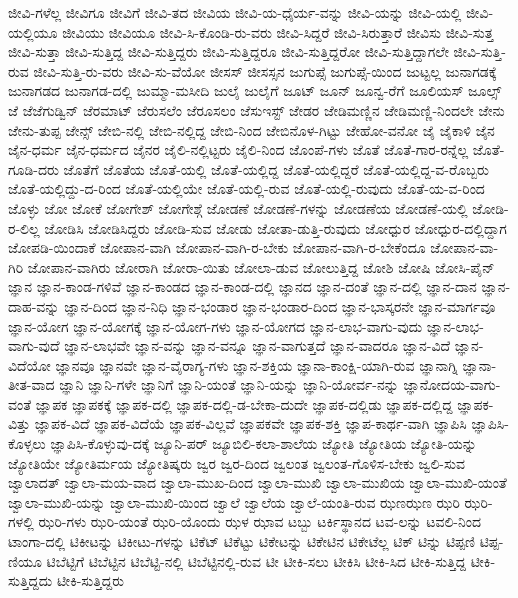 {ಜೀವಿ-ಗಳೆಲ್ಲ
ಜೀವಿಗೂ
ಜೀವಿಗೆ
ಜೀವಿ-ತದ
ಜೀವಿಯ
ಜೀವಿ-ಯ-ಧೈರ್ಯ-ವನ್ನು
ಜೀವಿ-ಯನ್ನು
ಜೀವಿ-ಯಲ್ಲಿ
ಜೀವಿ-ಯಲ್ಲಿಯೂ
ಜೀವಿಯು
ಜೀವಿಯೂ
ಜೀವಿ-ಸಿ-ಕೊಂಡಿ-ರು-ವರು
ಜೀವಿ-ಸಿದ್ದರೆ
ಜೀವಿ-ಸಿರುತ್ತಾರೆ
ಜೀವಿಸು
ಜೀವಿ-ಸುತ್ತ
ಜೀವಿ-ಸುತ್ತಾ
ಜೀವಿ-ಸುತ್ತಿದ್ದ
ಜೀವಿ-ಸುತ್ತಿದ್ದರು
ಜೀವಿ-ಸುತ್ತಿದ್ದರೂ
ಜೀವಿ-ಸುತ್ತಿದ್ದರೋ
ಜೀವಿ-ಸುತ್ತಿದ್ದಾಗಲೇ
ಜೀವಿ-ಸುತ್ತಿ-ರುವ
ಜೀವಿ-ಸುತ್ತಿ-ರು-ವರು
ಜೀವಿ-ಸು-ವೆಯೋ
ಜೀಸಸ್
ಜೀಸಸ್ಸನ
ಜುಗುಪ್ಸೆ
ಜುಗುಪ್ಸೆ-ಯಿಂದ
ಜುಟ್ಟಲ್ಲ
ಜುನಾಗಡಕ್ಕೆ
ಜುನಾಗಡದ
ಜುನಾಗಡ-ದಲ್ಲಿ
ಜುಮ್ಮಾ-ಮಸೀದಿ
ಜುಲೈ
ಜುಲೈಗೆ
ಜೂಟ್
ಜೂನ್
ಜೂನ್ವ-ರೆಗೆ
ಜೂಲಿಯಸ್
ಜೂಲ್ಸ್
ಜೆ
ಜೆಜೆಗುಡ್ವಿನ್
ಜೆರಮಾಟ್
ಜೆರುಸಲೆಂ
ಜೆರೂಸಲಂ
ಜೆಸುಇಸ್ಟ್
ಜೇಡರ
ಜೇಡಿಮಣ್ಣಿನ
ಜೇಡಿಮಣ್ಣಿ-ನಿಂದಲೇ
ಜೇನು
ಜೇನು-ತುಪ್ಪ
ಜೇನ್ಸ್
ಜೇಬಿ-ನಲ್ಲಿ
ಜೇಬಿ-ನಲ್ಲಿದ್ದ
ಜೇಬಿ-ನಿಂದ
ಜೇಬಿನೊಳ-ಗಿಟ್ಟು
ಜೇಹೋ-ವನೋ
ಜೈ
ಜೈಕಾಳಿ
ಜೈನ
ಜೈನ-ಧರ್ಮ
ಜೈನ-ಧರ್ಮದ
ಜೈನರ
ಜೈಲಿ-ನಲ್ಲಿಟ್ಟರು
ಜೈಲಿ-ನಿಂದ
ಜೊಂಪೆ-ಗಳು
ಜೊತೆ
ಜೊತೆ-ಗಾರ-ರನ್ನೆಲ್ಲ
ಜೊತೆ-ಗೂಡಿ-ದರು
ಜೊತೆಗೆ
ಜೊತೆಯ
ಜೊತೆ-ಯಲ್ಲಿ
ಜೊತೆ-ಯಲ್ಲಿದ್ದ
ಜೊತೆ-ಯಲ್ಲಿದ್ದರೆ
ಜೊತೆ-ಯಲ್ಲಿದ್ದ-ವ-ರೊಬ್ಬರು
ಜೊತೆ-ಯಲ್ಲಿದ್ದು-ದ-ರಿಂದ
ಜೊತೆ-ಯಲ್ಲಿಯೇ
ಜೊತೆ-ಯಲ್ಲಿ-ರುವ
ಜೊತೆ-ಯಲ್ಲಿ-ರುವುದು
ಜೊತೆ-ಯ-ವ-ರಿಂದ
ಜೊಳ್ಳು
ಜೋ
ಜೋಕೆ
ಜೋಗೇಶ್
ಜೋಗೇಶ್ಗೆ
ಜೋಡಣೆ
ಜೋಡಣೆ-ಗಳನ್ನು
ಜೋಡಣೆಯ
ಜೋಡಣೆ-ಯಲ್ಲಿ
ಜೋಡಿ-ರ-ಲಿಲ್ಲ
ಜೋಡಿಸಿ
ಜೋಡಿಸಿದ್ದರು
ಜೋಡಿ-ಸುವ
ಜೋಡು
ಜೋತಾ-ಡುತ್ತಿ-ರುವುದು
ಜೋಧ್ಪುರ
ಜೋಧ್ಪುರ-ದಲ್ಲಿದ್ದಾಗ
ಜೋಪಡಿ-ಯಿಂದಾಕೆ
ಜೋಪಾನ-ವಾಗಿ
ಜೋಪಾನ-ವಾಗಿ-ರ-ಬೇಕು
ಜೋಪಾನ-ವಾಗಿ-ರ-ಬೇಕೆಂದೂ
ಜೋಪಾನ-ವಾ-ಗಿರಿ
ಜೋಪಾನ-ವಾಗಿರು
ಜೋರಾಗಿ
ಜೋರಾ-ಯಿತು
ಜೋಲಾ-ಡುವ
ಜೋಲುತ್ತಿದ್ದ
ಜೋಶಿ
ಜೋಷಿ
ಜೋಸಿ-ಪೈನ್
ಜ್ಞಾನ
ಜ್ಞಾನ-ಕಾಂಡ-ಗಳಿವೆ
ಜ್ಞಾನ-ಕಾಂಡದ
ಜ್ಞಾನ-ಕಾಂಡ-ದಲ್ಲಿ
ಜ್ಞಾನದ
ಜ್ಞಾನ-ದಂತೆ
ಜ್ಞಾನ-ದಲ್ಲಿ
ಜ್ಞಾನ-ದಾನ
ಜ್ಞಾನ-ದಾಹ-ವನ್ನು
ಜ್ಞಾನ-ದಿಂದ
ಜ್ಞಾನ-ನಿಧಿ
ಜ್ಞಾನ-ಭಂಡಾರ
ಜ್ಞಾನ-ಭಂಡಾರ-ದಿಂದ
ಜ್ಞಾನ-ಭಾಸ್ಕರನೇ
ಜ್ಞಾನ-ಮಾರ್ಗವೂ
ಜ್ಞಾನ-ಯೋಗ
ಜ್ಞಾನ-ಯೋಗಕ್ಕೆ
ಜ್ಞಾನ-ಯೋಗ-ಗಳು
ಜ್ಞಾನ-ಯೋಗದ
ಜ್ಞಾನ-ಲಾಭ-ವಾಗು-ವುದು
ಜ್ಞಾನ-ಲಾಭ-ವಾಗು-ವುದೆ
ಜ್ಞಾನ-ಲಾಭವೇ
ಜ್ಞಾನ-ವನ್ನು
ಜ್ಞಾನ-ವನ್ನೂ
ಜ್ಞಾನ-ವಾಗುತ್ತದೆ
ಜ್ಞಾನ-ವಾದರೂ
ಜ್ಞಾನ-ವಿದೆ
ಜ್ಞಾನ-ವಿದೆಯೋ
ಜ್ಞಾನವೂ
ಜ್ಞಾನವೇ
ಜ್ಞಾನ-ವೈರಾಗ್ಯ-ಗಳು
ಜ್ಞಾನ-ಶಕ್ತಿಯ
ಜ್ಞಾನಾ-ಕಾಂಕ್ಷಿ-ಯಾಗಿ-ರುವ
ಜ್ಞಾನಾಗ್ನಿ
ಜ್ಞಾನಾ-ತೀತ-ವಾದ
ಜ್ಞಾನಿ
ಜ್ಞಾನಿ-ಗಳೇ
ಜ್ಞಾನಿಗೆ
ಜ್ಞಾನಿ-ಯಂತೆ
ಜ್ಞಾನಿ-ಯನ್ನು
ಜ್ಞಾನಿ-ಯೋರ್ವ-ನನ್ನು
ಜ್ಞಾನೋದಯ-ವಾಗು-ವಂತೆ
ಜ್ಞಾಪಕ
ಜ್ಞಾಪಕಕ್ಕೆ
ಜ್ಞಾಪಕ-ದಲ್ಲಿ
ಜ್ಞಾಪಕ-ದಲ್ಲಿ-ಡ-ಬೇಕಾ-ದುದೇ
ಜ್ಞಾಪಕ-ದಲ್ಲಿಡು
ಜ್ಞಾಪಕ-ದಲ್ಲಿದ್ದ
ಜ್ಞಾಪಕ-ವಿತ್ತು
ಜ್ಞಾಪಕ-ವಿದೆ
ಜ್ಞಾಪಕ-ವಿದೆಯೆ
ಜ್ಞಾಪಕ-ವಿಲ್ಲವೆ
ಜ್ಞಾಪಕವೇ
ಜ್ಞಾಪಕ-ಶಕ್ತಿ
ಜ್ಞಾಪ-ಕಾರ್ಥ-ವಾಗಿ
ಜ್ಞಾಪಿಸಿ
ಜ್ಞಾಪಿಸಿ-ಕೊಳ್ಳಲು
ಜ್ಞಾಪಿಸಿ-ಕೊಳ್ಳುವು-ದಕ್ಕೆ
ಜ್ಯೂನಿ-ಪರ್
ಜ್ಯೂಬಿಲಿ-ಕಲಾ-ಶಾಲೆಯ
ಜ್ಯೋತಿ
ಜ್ಯೋತಿಯ
ಜ್ಯೋತಿ-ಯನ್ನು
ಜ್ಯೋತಿಯೇ
ಜ್ಯೋತಿರ್ಮಯ
ಜ್ಯೋತಿಷ್ಕರು
ಜ್ವರ
ಜ್ವರ-ದಿಂದ
ಜ್ವಲಂತ
ಜ್ವಲಂತ-ಗೊಳಿಸ-ಬೇಕು
ಜ್ವಲಿ-ಸುವ
ಜ್ವಾಲಾದತ್
ಜ್ವಾಲಾ-ಮಯ-ವಾದ
ಜ್ವಾಲಾ-ಮುಖ-ದಿಂದ
ಜ್ವಾಲಾ-ಮುಖಿ
ಜ್ವಾಲಾ-ಮುಖಿಯ
ಜ್ವಾಲಾ-ಮುಖಿ-ಯಂತೆ
ಜ್ವಾಲಾ-ಮುಖಿ-ಯನ್ನು
ಜ್ವಾಲಾ-ಮುಖಿ-ಯಿಂದ
ಜ್ವಾಲೆ
ಜ್ವಾಲೆಯ
ಜ್ವಾಲೆ-ಯಂತಿ-ರುವ
ಝಣಝಣ
ಝರಿ
ಝರಿ-ಗಳಲ್ಲಿ
ಝರಿ-ಗಳು
ಝರಿ-ಯಂತೆ
ಝರಿ-ಯೊಂದು
ಝಳ
ಝಾವ
ಟಬ್ಬು
ಟರ್ಕಿಸ್ಥಾನದ
ಟವ-ಲನ್ನು
ಟವಲಿ-ನಿಂದ
ಟಾಂಗಾ-ದಲ್ಲಿ
ಟಿಕೀಟನ್ನು
ಟಿಕೀಟು-ಗಳನ್ನು
ಟಿಕೆಟ್
ಟಿಕೆಟ್ಟು
ಟಿಕೇಟನ್ನು
ಟಿಕೇಟಿನ
ಟಿಕೇಟೆಲ್ಲ
ಟಿಕ್
ಟಿನ್ನು
ಟಿಪ್ಪಣಿ
ಟಿಪ್ಪ-ಣಿಯೂ
ಟಿಬೆಟ್ಟಿಗೆ
ಟಿಬೆಟ್ಟಿನ
ಟಿಬೆಟ್ಟಿ-ನಲ್ಲಿ
ಟಿಬೆಟ್ಟಿನಲ್ಲಿ-ರುವ
ಟೀ
ಟೀಕಿ-ಸಲು
ಟೀಕಿಸಿ
ಟೀಕಿ-ಸಿದ
ಟೀಕಿ-ಸುತ್ತಿದ್ದ
ಟೀಕಿ-ಸುತ್ತಿದ್ದದು
ಟೀಕಿ-ಸುತ್ತಿದ್ದರು
}
